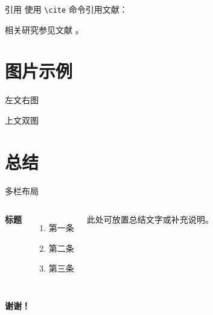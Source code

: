 \documentclass[aspectratio=169,xcolor=dvipsnames]{beamer}
\begin{document}
\begin{frame}[fragile]{引用}
    使用 \verb|\cite| 命令引用文献：

    相关研究参见文献 \cite{p1}。
\end{frame}

\section{图片示例}

\begin{frame}{左文右图}
\end{frame}

\begin{frame}{上文双图}
\end{frame}

\section{总结}

\begin{frame}{多栏布局}
    \begin{columns}[c]
        \textbf{标题}
        \begin{enumerate}
            \item 第一条
            \item 第二条
            \item 第三条
        \end{enumerate}
        此处可放置总结文字或补充说明。
    \end{columns}
\end{frame}

\begin{frame}
    \Huge{\centerline{\textbf{谢谢！}}}
\end{frame}

\end{document}

